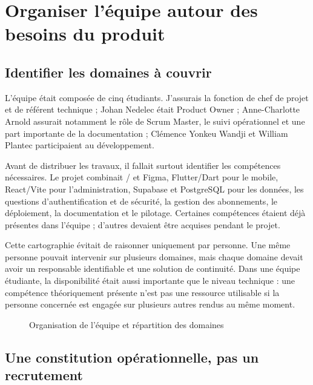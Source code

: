\section{Organiser l'équipe autour des besoins du produit}

\subsection{Identifier les domaines à couvrir}

L'équipe était composée de cinq étudiants. J'assurais la fonction de chef de projet et de référent technique ; Johan Nedelec était Product Owner ; Anne-Charlotte Arnold assurait notamment le rôle de Scrum Master, le suivi opérationnel et une part importante de la documentation ; Clémence Yonkeu Wandji et William Plantec participaient au développement.

Avant de distribuer les travaux, il fallait surtout identifier les compétences nécessaires. Le projet combinait / et Figma, Flutter/Dart pour le mobile, React/Vite pour l'administration, Supabase et PostgreSQL pour les données, les questions d'authentification et de sécurité, la gestion des abonnements, le déploiement, la documentation et le pilotage. Certaines compétences étaient déjà présentes dans l'équipe ; d'autres devaient être acquises pendant le projet.

Cette cartographie évitait de raisonner uniquement par personne. Une même personne pouvait intervenir sur plusieurs domaines, mais chaque domaine devait avoir un responsable identifiable et une solution de continuité. Dans une équipe étudiante, la disponibilité était aussi importante que le niveau technique : une compétence théoriquement présente n'est pas une ressource utilisable si la personne concernée est engagée sur plusieurs autres rendus au même moment.

\begin{figure}[H]
\centering
{}
\caption{Organisation de l'équipe et répartition des domaines}
\label{fig:lynx-equipe}
\end{figure}

\subsection{Une constitution opérationnelle, pas un recrutement}


